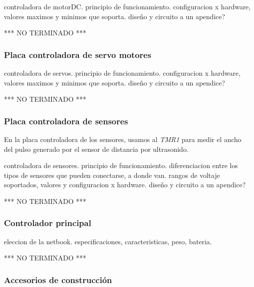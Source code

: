 controladora de motorDC.
principio de funcionamiento.
configuracion x hardware, valores maximos y minimos que soporta.
diseño y circuito a un apendice?






*** NO TERMINADO ***



\subsubsection{Placa controladora de servo motores}
\label{HAPservos}

controladora de servos.
principio de funcionamiento.
configuracion x hardware, valores maximos y minimos que soporta.
diseño y circuito a un apendice?




*** NO TERMINADO ***





\subsubsection{Placa controladora de sensores}
\label{HAPsensores}

En la placa controladora de los sensores, usamos al \emph{TMR1} para medir el ancho del pulso generado por el sensor de distancia
por ultrasonido.


controladora de sensores.
principio de funcionamiento.
diferenciacion entre los tipos de sensores que pueden conectarse, a donde van.
rangos de voltaje soportados, valores y configuracion x hardware.
diseño y circuito a un apendice?




*** NO TERMINADO ***





\subsubsection{Controlador principal}
\label{HAPprincipal}

eleccion de la netbook.
especificaciones, caracteristicas, peso, bateria.





*** NO TERMINADO ***





\subsubsection{Accesorios de construcci\'on}
\label{HAaccesorios}

